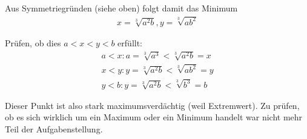 \documentclass[a4paper,german,12pt,smallheadings]{scrartcl}
\begin{document}
  Aus Symmetriegründen (siehe oben) folgt damit das Minimum
  \begin{align*}
    x = \sqrt[3]{a^2 b}, y = \sqrt[3]{ab^2}
  \end{align*}

  Prüfen, ob dies $a<x<y<b$ erfüllt:
  \begin{align*}
    a<x : a = \sqrt[3]{a^3} < \sqrt[3]{a^2b} = x \\
    x<y : y = \sqrt[3]{a^2b} < \sqrt[3]{ab^2} = y \\
    y<b : y = \sqrt[3]{a^2b} < \sqrt[3]{b^3} = b
  \end{align*}

  Dieser Punkt ist also stark maximumsverdächtig (weil Extremwert). Zu prüfen,
  ob es sich wirklich um ein Maximum oder ein Minimum handelt war nicht mehr
  Teil der Aufgabenstellung.
\end{document}
